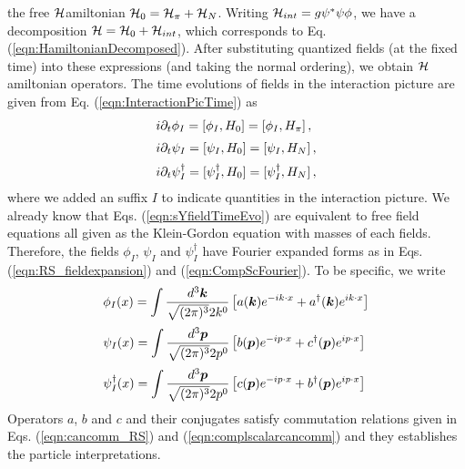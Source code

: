 the free ${\cal H}$amiltonian ${\cal H}_0 = {\cal H}_\pi + {\cal H}_N$.
Writing ${\cal H}_{int} = g\psi^*\psi \phi$, 
we have a decomposition ${\cal H} = {\cal H}_{0}  + {\cal H}_{int}$,
which corresponds to Eq. (\ref{eqn:HamiltonianDecomposed}).
After substituting quantized fields (at the fixed time) into these expressions
(and taking the normal ordering), we obtain ${\cal H}$amiltonian operators.
The time evolutions of fields in the interaction picture are given from
Eq. (\ref{eqn:InteractionPicTime}) as
\begin{eqnarray}
\begin{array}{l}
i \partial_t \phi_I = [\phi_I, H_0] = [\phi_I, H_\pi]\,,
\vspace{2mm}
\\
i \partial_t \psi_I = [\psi_I, H_0] = [\psi_I, H_N]\,,
\vspace{2mm}
\\
i \partial_t \psi^\dagger_I = [\psi^\dagger_I, H_0] = [\psi^\dagger_I, H_N]\,,
\end{array}
\label{eqn:sYfieldTimeEvo}
\end{eqnarray}
where we added an suffix $I$ to indicate quantities in the interaction picture.
We already know that Eqs. (\ref{eqn:sYfieldTimeEvo}) are equivalent to
free field equations all given as the Klein-Gordon equation with masses of
each fields. Therefore, the fields $\phi_I$, $\psi_I$ and $\psi^\dagger_I$ have
Fourier expanded forms as in Eqs. (\ref{eqn:RS_fieldexpansion}) and (\ref{eqn:CompScFourier}).
To be specific, we write
\begin{eqnarray}
\begin{array}{l}
\displaystyle
\phi_{I}(x) = \int \frac{d^3 \bld{k}}{\sqrt{(2\pi)^3}2k^0} \left[
a(\bld{k}) e^{-i k \cdot x} + a^\dagger(\bld{k})e^{i k \cdot x} \right]
\vspace{2mm}
\\
\displaystyle
\psi_{I}(x) = \int \frac{d^3 \bld{p}}{\sqrt{(2\pi)^3}2p^0} \left[
b(\bld{p}) e^{-i p \cdot x} + c^\dagger(\bld{p})e^{i p \cdot x} \right]
\vspace{2mm}
\\
\displaystyle
\psi^\dagger_{I}(x) = \int \frac{d^3 \bld{p}}{\sqrt{(2\pi)^3}2p^0} \left[
c(\bld{p})e^{- i p \cdot x}  + b^\dagger (\bld{p}) e^{i p \cdot x} \right]
\end{array}
\label{eqn:scYfields}
\end{eqnarray}
Operators $a$, $b$ and $c$ and their conjugates satisfy
commutation relations given in Eqs. (\ref{eqn:cancomm_RS}) and 
(\ref{eqn:complscalarcancomm}) and they establishes the particle interpretations.
